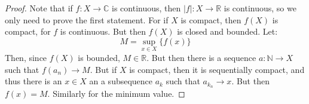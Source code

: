             \begin{proof}
                Note that if $f:X\rightarrow\mathbb{C}$ is
                continuous, then $|f|:X\rightarrow\mathbb{R}$ is
                continuous, so we only need to prove the first
                statement. For if $X$ is compact, then $f(X)$ is
                compact, for $f$ is continuous. But then $f(X)$
                is closed and bounded. Let:
                \begin{equation}
                    M=\underset{x\in{X}}\sup\{f(x)\}
                \end{equation}
                Then, since $f(X)$ is bounded, $M\in\mathbb{R}$.
                But then there is a sequence
                $a:\mathbb{N}\rightarrow{X}$ such that
                $f(a_{n})\rightarrow{M}$. But if $X$ is
                compact, then it is sequentially compact, and
                thus there is an $x\in{X}$ an a subsequence
                $a_{k}$ such that $a_{k_{n}}\rightarrow{x}$.
                But then $f(x)=M$. Similarly for the minimum value.
            \end{proof}
